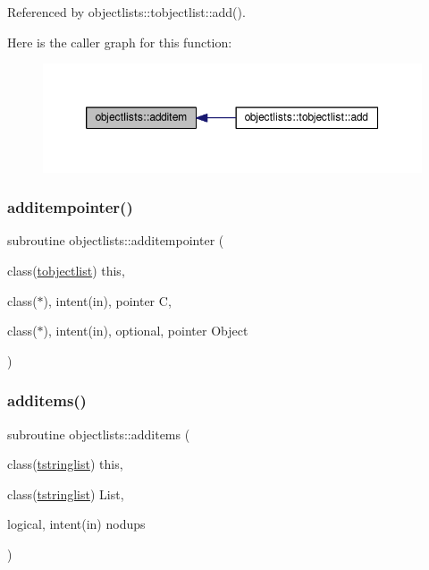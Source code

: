 Referenced by objectlists\+::tobjectlist\+::add().

Here is the caller graph for this function\+:
\nopagebreak
\begin{figure}[H]
\begin{center}
\leavevmode
\includegraphics[width=350pt]{namespaceobjectlists_a36d198e7276f781aed81d70840e2f9da_icgraph}
\end{center}
\end{figure}
\mbox{\label{namespaceobjectlists_a20f8947e7e2c99268f61a292e215f144}} 
\subsubsection{\texorpdfstring{additempointer()}{additempointer()}}
{\footnotesize\ttfamily subroutine objectlists\+::additempointer (\begin{DoxyParamCaption}\item[{class(\mbox{\hyperlink{structobjectlists_1_1tobjectlist}{tobjectlist}})}]{this,  }\item[{class($\ast$), intent(in), pointer}]{C,  }\item[{class($\ast$), intent(in), optional, pointer}]{Object }\end{DoxyParamCaption})\hspace{0.3cm}{\ttfamily [private]}}

\mbox{\label{namespaceobjectlists_a4891ff4be9767fe63e6223924e02c450}} 
\subsubsection{\texorpdfstring{additems()}{additems()}}
{\footnotesize\ttfamily subroutine objectlists\+::additems (\begin{DoxyParamCaption}\item[{class(\mbox{\hyperlink{structobjectlists_1_1tstringlist}{tstringlist}})}]{this,  }\item[{class(\mbox{\hyperlink{structobjectlists_1_1tstringlist}{tstringlist}})}]{List,  }\item[{logical, intent(in)}]{nodups }\end{DoxyParamCaption})\hspace{0.3cm}{\ttfamily [private]}}

